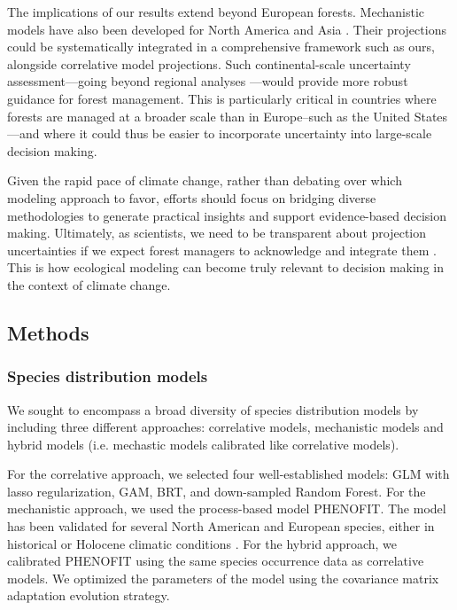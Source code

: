 \documentclass[11pt,letter]{article}
\begin{document}
The implications of our results extend beyond European forests. Mechanistic models have also been developed for North America and Asia \citep{Morin2007, Fang2022}. Their projections could be systematically integrated in a comprehensive framework such as ours, alongside correlative model projections. Such continental-scale uncertainty assessment---going beyond regional analyses \citep{Iverson2016}---would provide more robust guidance for forest management. This is particularly critical in countries where forests are managed at a broader scale than in Europe--such as the United States---and where it could thus be easier to incorporate uncertainty into large-scale decision making. 

Given the rapid pace of climate change, rather than debating over which modeling approach to favor, efforts should focus on bridging diverse methodologies to generate practical insights and support evidence-based decision making. Ultimately, as scientists, we need to be transparent about projection uncertainties if we expect forest managers to acknowledge and integrate them \citep{Saltelli2020}. This is how ecological modeling can become truly relevant to decision making in the context of climate change.


\subsection*{Methods}

\subsubsection*{Species distribution models}

We sought to encompass a broad diversity of species distribution models by including three different approaches: correlative models, mechanistic models and hybrid models (i.e. mechastic models calibrated like correlative models\citep{VanderMeersch2023}).

For the correlative approach, we selected four well-established models\citep{Valavi2022}: GLM with lasso regularization, GAM, BRT, and down-sampled Random Forest. For the mechanistic approach, we used the process-based model PHENOFIT. The model has been validated for several North American and European species, either in historical or Holocene climatic conditions \citep{Morin2007, Saltre2013, Duputie2015, Gauzere2020, VanderMeersch2025}. For the hybrid approach, we calibrated PHENOFIT using the same species occurrence data as correlative models\citep{VanderMeersch2023}. We optimized the parameters of the model using the covariance matrix adaptation evolution strategy\citep{Hansen2001}.
\end{document}
